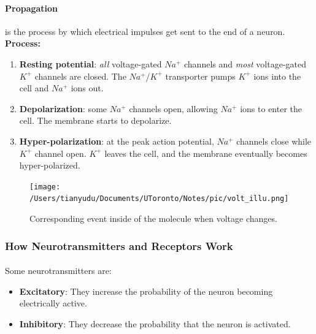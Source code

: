 \documentclass{article}
\begin{document}
	\paragraph{Propagation} is the process by which electrical impulses get sent to the end of a neuron.
	\newline \textbf{Process:}
	\begin{enumerate}
		\item \textbf{Resting potential}: \emph{all} voltage-gated $Na^+$ channels and \emph{most} voltage-gated $K^+$ channels are closed. The $Na^+$/$K^+$ transporter pumps $K^+$ ions into the cell and $Na^+$ ions out. 
		\item \textbf{Depolarization}: some $Na^+$ channels open, allowing $Na^+$ ions to enter the cell. The membrane starts to depolarize.
		\item \textbf{Hyper-polarization}: at the peak action potential, $Na^+$ channels close while $K^+$ channel open. $K^+$ leaves the cell, and the membrane eventually becomes hyper-polarized.
	\end{enumerate}
	\begin{figure}[H]
		\texttt{[image: /Users/tianyudu/Documents/UToronto/Notes/pic/volt\_illu.png]}	
		\caption{Corresponding event inside of the molecule when voltage changes.}
	\end{figure}
	\subsubsection{How Neurotransmitters and Receptors Work}
	\paragraph{}Some neurotransmitters are:
	\begin{itemize}
		\item \textbf{Excitatory}: They increase the probability of the neuron becoming electrically active.
		\item \textbf{Inhibitory}: They decrease the probability that the neuron is activated.
	\end{itemize}
\end{document}
